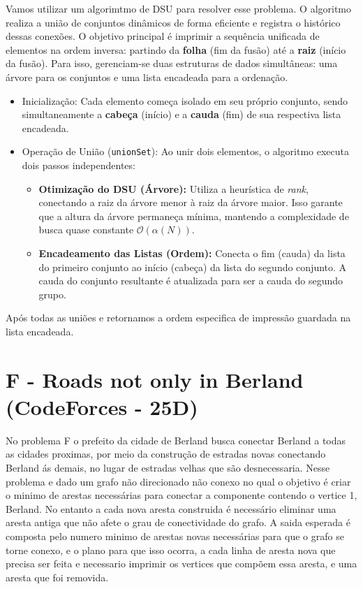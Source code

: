 \documentclass[12pt,a4paper]{article}
\begin{document}
Vamos utilizar um algorimtmo de DSU para resolver esse problema. O algoritmo realiza a união de conjuntos dinâmicos de forma eficiente e registra o histórico dessas conexões. O objetivo principal é imprimir a sequência unificada de elementos na ordem inversa: partindo da \textbf{folha} (fim da fusão) até a \textbf{raiz} (início da fusão). Para isso, gerenciam-se duas estruturas de dados simultâneas: uma árvore para os conjuntos e uma lista encadeada para a ordenação.
\begin{itemize}
    \item {Inicialização}: Cada elemento começa isolado em seu próprio conjunto, sendo simultaneamente a \textbf{cabeça} (início) e a \textbf{cauda} (fim) de sua respectiva lista encadeada.
    \item Operação de União (\texttt{unionSet}): Ao unir dois elementos, o algoritmo executa dois passos independentes:
    \begin{itemize}
        \item \textbf{Otimização do DSU (Árvore):} Utiliza a heurística de \textit{rank}, conectando a raiz da árvore menor à raiz da árvore maior. Isso garante que a altura da árvore permaneça mínima, mantendo a complexidade de busca quase constante $\mathcal{O}(\alpha(N))$.
        \item \textbf{Encadeamento das Listas (Ordem):} Conecta o fim (cauda) da lista do primeiro conjunto ao início (cabeça) da lista do segundo conjunto. A cauda do conjunto resultante é atualizada para ser a cauda do segundo grupo.
    \end{itemize}

\end{itemize}

Após todas as uniões e retornamos a ordem especifica de impressão guardada na lista encadeada.

\section{F - Roads not only in Berland (CodeForces - 25D)}

No problema F o prefeito da cidade de Berland busca conectar Berland a todas as cidades proximas, por meio da construção de estradas novas conectando Berland ás demais, no lugar de estradas velhas que são desnecessaria. Nesse problema e dado um grafo não direcionado não conexo no qual o objetivo é criar o minimo de arestas necessárias para conectar a componente contendo o vertice 1, Berland.
No entanto a cada nova aresta construida é necessário eliminar uma aresta antiga que não afete o grau de conectividade do grafo. A saida esperada é composta pelo numero minimo de arestas novas necessárias para que o grafo se torne conexo, e o plano para que isso ocorra, a cada linha de aresta nova que precisa ser feita e necessario imprimir os vertices que compõem essa aresta, e uma aresta
que foi removida.
\end{document}
